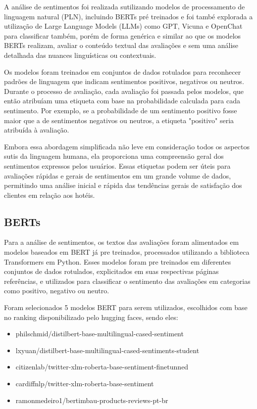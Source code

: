 A análise de sentimentos foi realizada sutilizando modelos de processamento de linguagem natural (PLN), incluindo BERTs pré treinados e foi també explorada a utilização de Large Language Models (LLMs) como GPT, Vicuna e OpenChat para classificar também, porém de forma genérica e similar ao que os modelos BERTs realizam, avaliar o conteúdo textual das avaliações e sem uma análise detalhada das nuances linguísticas ou contextuais.

Os modelos foram treinados em conjuntos de dados rotulados para reconhecer padrões de linguagem que indicam sentimentos positivos, negativos ou neutros. Durante o processo de avaliação, cada avaliação foi passada pelos modelos, que então atribuíam uma etiqueta com base na probabilidade calculada para cada sentimento. Por exemplo, se a probabilidade de um sentimento positivo fosse maior que a de sentimentos negativos ou neutros, a etiqueta "positivo" seria atribuída à avaliação.

Embora essa abordagem simplificada não leve em consideração todos os aspectos sutis da linguagem humana, ela proporciona uma compreensão geral dos sentimentos expressos pelos usuários. Essas etiquetas podem ser úteis para avaliações rápidas e gerais de sentimentos em um grande volume de dados, permitindo uma análise inicial e rápida das tendências gerais de satisfação dos clientes em relação aos hotéis.


\subsection{BERTs}
\label{subsec:analise_sentimentos:bert}

Para a análise de sentimentos, os textos das avaliações foram alimentados em modelos baseados em BERT já pre treinados, processados utilizando a biblioteca Transformers em Python. Esses modelos foram pre treinados em diferentes conjuntos de dados rotulados, explicitados em suas respectivas páginas referências, e utilizados para classificar o sentimento das avaliações em categorias como positivo, negativo ou neutro.

Foram selecionados 5 modelos BERT para serem utilizados, escolhidos com base no ranking disponibilizado pelo hugging faces, sendo eles:
\begin{itemize}
	\item philschmid/distilbert-base-multilingual-cased-sentiment
	\item lxyuan/distilbert-base-multilingual-cased-sentiments-student
	\item citizenlab/twitter-xlm-roberta-base-sentiment-finetunned
	\item cardiffnlp/twitter-xlm-roberta-base-sentiment
	\item ramonmedeiro1/bertimbau-products-reviews-pt-br
\end{itemize}

